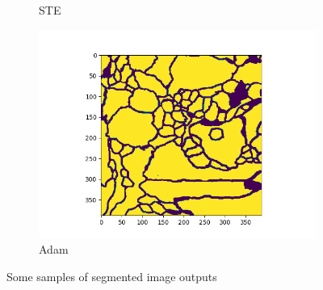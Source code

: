 \begin{figure}[h]
\begin{subfigure}[b]{0.3\textwidth}
         \caption{STE}
     \end{subfigure}
     \hfill
     \begin{subfigure}[b]{0.3\textwidth}
         \centering
         \includegraphics[width=1.3\textwidth]{../openreview/figs/output_normal.png}
         \caption{Adam}
     \end{subfigure}
        \caption{Some samples of segmented image outputs}
        \label{fig5}
\end{figure}